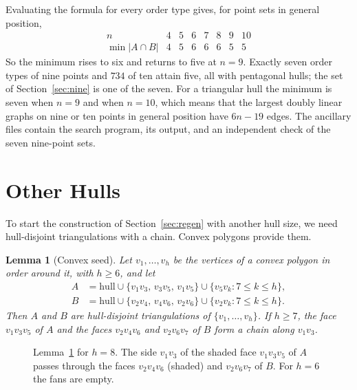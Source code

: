 \documentclass[11pt]{amsart}
\newtheorem{lemma}[theorem]{Lemma}
\theoremstyle{definition}
\begin{document}
Evaluating the formula for every order type gives, for point sets in general position,
\[
\begin{array}{c|ccccccc}
 n & 4 & 5 & 6 & 7 & 8 & 9 & 10\\\hline
 \min|A\cap B| & 4 & 5 & 6 & 6 & 6 & 5 & 5
\end{array}
\]
So the minimum rises to six and returns to five at $n=9$. Exactly seven order types of nine points and $734$ of ten attain five, all with pentagonal hulls; the set of Section~\ref{sec:nine} is one of the seven. For a triangular hull the minimum is seven when $n=9$ and when $n=10$, which means that the largest doubly linear graphs on nine or ten points in general position have $6n-19$ edges. The ancillary files contain the search program, its output, and an independent check of the seven nine-point sets.

\section{Other Hulls}\label{sec:hulls}

To start the construction of Section~\ref{sec:regen} with another hull size, we need hull-disjoint triangulations with a chain. Convex polygons provide them.

\begin{lemma}[Convex seed]\label{lem:convex}
Let $v_1,\dots,v_h$ be the vertices of a convex polygon in order around it, with $h\geq6$, and let
\begin{align*}
A&=\text{hull}\cup\{v_1v_3,\,v_3v_5,\,v_1v_5\}\cup\{v_5v_k: 7\leq k\leq h\},\\
B&=\text{hull}\cup\{v_2v_4,\,v_4v_6,\,v_2v_6\}\cup\{v_2v_k: 7\leq k\leq h\}.
\end{align*}
Then $A$ and $B$ are hull-disjoint triangulations of $\{v_1,\dots,v_h\}$. If $h\geq7$, the face $v_1v_3v_5$ of $A$ and the faces $v_2v_4v_6$ and $v_2v_6v_7$ of $B$ form a chain along $v_1v_3$.
\end{lemma}

\begin{figure}[t]
\centering
\caption{Lemma~\ref{lem:convex} for $h=8$. The side $v_1v_3$ of the shaded face $v_1v_3v_5$ of $A$ passes through the faces $v_2v_4v_6$ (shaded) and $v_2v_6v_7$ of $B$. For $h=6$ the fans are empty.}\label{fig:convex}
\end{figure}
\end{document}
